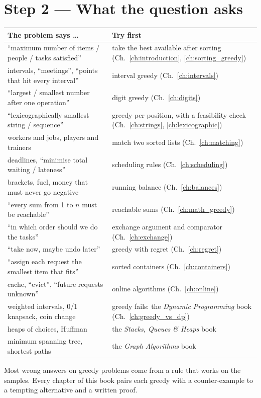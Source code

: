 \clearpage
\section*{Step 2 --- What the question asks}

\begingroup\small\renewcommand{\arraystretch}{1.3}
\begin{tabularx}{\linewidth}{@{}>{\raggedright\arraybackslash}p{6.2cm} X@{}}
\toprule
\textbf{The problem says \ldots} & \textbf{Try first} \\
\midrule
``maximum number of items / people / tasks satisfied'' & take the best available after sorting (Ch.~\ref{ch:introduction}, \ref{ch:sorting_greedy}) \\
intervals, ``meetings'', ``points that hit every interval'' & interval greedy (Ch.~\ref{ch:intervals}) \\
``largest / smallest number after one operation'' & digit greedy (Ch.~\ref{ch:digits}) \\
``lexicographically smallest string / sequence'' & greedy per position, with a feasibility check (Ch.~\ref{ch:strings}, \ref{ch:lexicographic}) \\
workers and jobs, players and trainers & match two sorted lists (Ch.~\ref{ch:matching}) \\
deadlines, ``minimise total waiting / lateness'' & scheduling rules (Ch.~\ref{ch:scheduling}) \\
brackets, fuel, money that must never go negative & running balance (Ch.~\ref{ch:balances}) \\
``every sum from 1 to $n$ must be reachable'' & reachable sums (Ch.~\ref{ch:math_greedy}) \\
``in which order should we do the tasks'' & exchange argument and comparator (Ch.~\ref{ch:exchange}) \\
``take now, maybe undo later'' & greedy with regret (Ch.~\ref{ch:regret}) \\
``assign each request the smallest item that fits'' & sorted containers (Ch.~\ref{ch:containers}) \\
cache, ``evict'', ``future requests unknown'' & online algorithms (Ch.~\ref{ch:online}) \\
weighted intervals, 0/1 knapsack, coin change & greedy fails: the \textit{Dynamic Programming} book (Ch.~\ref{ch:greedy_vs_dp}) \\
heaps of choices, Huffman & the \textit{Stacks, Queues \& Heaps} book \\
minimum spanning tree, shortest paths & the \textit{Graph Algorithms} book \\
\bottomrule
\end{tabularx}
\endgroup

\begin{warningbox}
Most wrong answers on greedy problems come from a rule that works on the samples. Every chapter of this book pairs each greedy with a counter-example to a tempting alternative and a written proof.
\end{warningbox}
